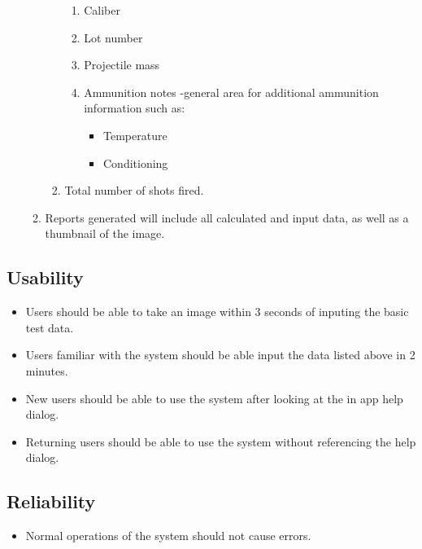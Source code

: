 \begin{enumerate}
\begin{enumerate}
\begin{enumerate}
			\begin{enumerate}
				\item Caliber
				\item Lot number
				\item Projectile mass
				\item Ammunition notes -general area for additional ammunition information such as:
				\begin{itemize}
					\item Temperature
					\item Conditioning
				\end{itemize}
			\end{enumerate}
			\item Total number of shots fired.
		\end{enumerate}
		\item Reports generated will include all calculated and input data, as well as a thumbnail of the 				image.
	\end{enumerate}
\end{enumerate}
\subsection{Usability}
\begin{itemize}
\item Users should be able to take an image within 3 seconds of inputing the basic test data.
\item Users familiar with the system should be able input the data listed above in 2 minutes.
\item New users should be able to use the system after looking at the in app help dialog.
\item Returning users should be able to use the system without referencing the help dialog.
\end{itemize}
\subsection{Reliability}
\begin{itemize}
\item Normal operations of the system should not cause errors.
\end{itemize}
